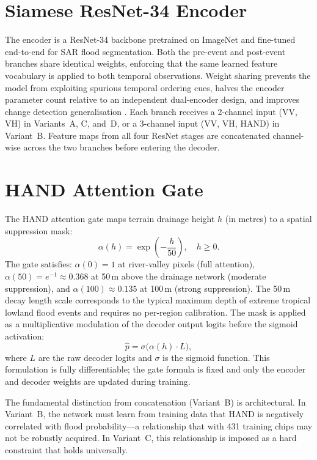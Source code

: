 \documentclass[12pt,oneside]{report}
\begin{document}
\section{Siamese ResNet-34 Encoder}

The encoder is a ResNet-34 backbone \cite{he2016deep} pretrained on ImageNet
and fine-tuned end-to-end for SAR flood segmentation.
Both the pre-event and post-event branches share identical weights, enforcing
that the same learned feature vocabulary is applied to both temporal
observations.
Weight sharing prevents the model from exploiting spurious temporal ordering
cues, halves the encoder parameter count relative to an independent dual-encoder
design, and improves change detection generalisation \cite{daudt2018fully}.
Each branch receives a 2-channel input (VV, VH) in Variants~A, C, and~D, or a
3-channel input (VV, VH, HAND) in Variant~B.
Feature maps from all four ResNet stages are concatenated channel-wise across
the two branches before entering the decoder.

\section{HAND Attention Gate}
\label{sec:hand_gate}

The HAND attention gate maps terrain drainage height $h$ (in metres) to a
spatial suppression mask:
\begin{equation}
  \alpha(h) = \exp\!\left(-\frac{h}{50}\right), \quad h \geq 0.
  \label{eq:gate}
\end{equation}
The gate satisfies: $\alpha(0) = 1$ at river-valley pixels (full attention),
$\alpha(50) = e^{-1} \approx 0.368$ at 50\,m above the drainage network
(moderate suppression), and $\alpha(100) \approx 0.135$ at 100\,m (strong
suppression).
The 50\,m decay length scale corresponds to the typical maximum depth of extreme
tropical lowland flood events and requires no per-region calibration.
The mask is applied as a multiplicative modulation of the decoder output logits
before the sigmoid activation:
\begin{equation}
  \hat{p} = \sigma\!\bigl(\alpha(h) \cdot L\bigr),
  \label{eq:gate_apply}
\end{equation}
where $L$ are the raw decoder logits and $\sigma$ is the sigmoid function.
This formulation is fully differentiable; the gate formula is fixed and only
the encoder and decoder weights are updated during training.

The fundamental distinction from concatenation (Variant~B) is architectural.
In Variant~B, the network must learn from training data that HAND is negatively
correlated with flood probability—a relationship that with 431 training chips
may not be robustly acquired.
In Variant~C, this relationship is imposed as a hard constraint that holds
universally.
\end{document}
